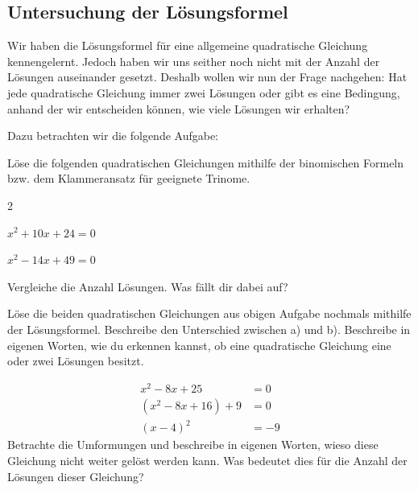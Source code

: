 \documentclass[11pt,oneside]{article}
\begin{document}
\subsection{Untersuchung der Lösungsformel}
	Wir haben die Lösungsformel für eine allgemeine quadratische Gleichung kennengelernt. Jedoch haben wir uns seither noch nicht mit der Anzahl der Lösungen auseinander gesetzt. Deshalb wollen wir nun der Frage nachgehen: \glqq Hat jede quadratische Gleichung immer zwei Lösungen oder gibt es eine Bedingung, anhand der wir entscheiden können, wie viele Lösungen wir erhalten?\grqq

	Dazu betrachten wir die folgende Aufgabe:
	\begin{aufgabe}
		Löse die folgenden quadratischen Gleichungen mithilfe der binomischen Formeln bzw. dem Klammeransatz für geeignete Trinome.
		\begin{enumerate}[label=\alph*)]\end{enumerate}
		Vergleiche die Anzahl Lösungen. Was fällt dir dabei auf?\vspace{5pt}\newline{}
	\end{aufgabe}
	\begin{aufgabe}
		Löse die beiden quadratischen Gleichungen aus obigen Aufgabe nochmals mithilfe der Lösungsformel. Beschreibe den Unterschied zwischen a) und b).\vspace{11pt}\newline
		Beschreibe in eigenen Worten, wie du erkennen kannst, ob eine quadratische Gleichung eine oder zwei Lösungen besitzt.\vspace{5pt}\newline\karos{2}
	\end{aufgabe}
	\begin{aufgabe}
		\begin{align*}
			x^2-8x+25&=0\\
			(x^2-8x+16)+9&=0\\
			(x-4)^2&=-9
		\end{align*}
		Betrachte die Umformungen und beschreibe in eigenen Worten, wieso diese Gleichung nicht weiter gelöst werden kann.\vspace{11pt}\newline
		Was bedeutet dies für die Anzahl der Lösungen dieser Gleichung?\vspace{5pt}\newline\karos{4}
	\end{aufgabe}
\end{document}
